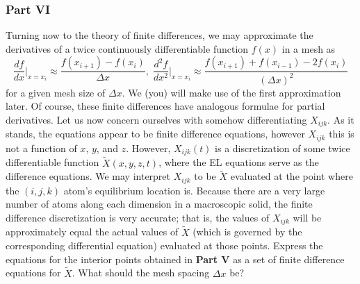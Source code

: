 \documentclass[letterpaper,12pt]{article}
\newcommand*{\deriv}[2]{\frac{d #1}{d #2}}
\newcommand*{\nderiv}[3]{\frac{d^{#3} #1}{d #2^{#3}}}
\begin{document}
\begin{flushleft}
    \subsubsection*{Part VI}
    Turning now to the theory of finite differences, we may approximate the derivatives of a twice continuously differentiable function $f(x)$ in a mesh as
    $$\deriv{f}{x}\bigg|_{x=x_i} \approx \frac{f(x_{i+1}) - f(x_i)}{\Delta x}, \; \nderiv{f}{x}{2}\bigg|_{x=x_i} \approx \frac{f(x_{i+1}) + f(x_{i-1}) - 2f(x_i)}{\left(\Delta x\right)^2}$$
    for a given mesh size of $\Delta x$. We (you) will make use of the first approximation later. Of course, these finite differences have analogous formulae for partial derivatives.\newline\newline
    Let us now concern ourselves with somehow differentiating $X_{ijk}$. As it stands, the equations appear to be finite difference equations, however $X_{ijk}$ this is not a function of $x$, $y$, and $z$. However, $X_{ijk}(t)$ is a discretization of some twice differentiable function $\tilde{X}(x, y, z, t)$, where the EL equations serve as the difference equations. We may interpret $X_{ijk}$ to be $\tilde{X}$ evaluated at the point where the $(i, j, k)$ atom's equilibrium location is. Because there are a very large number of atoms along each dimension in a macroscopic solid, the finite difference discretization is very accurate; that is, the values of $X_{ijk}$ will be approximately equal the actual values of $\tilde{X}$ (which is governed by the corresponding differential equation) evaluated at those points.\newline\newline
    Express the equations for the interior points obtained in \textbf{Part V} as a set of finite difference equations for $\tilde{X}$. What should the mesh spacing $\Delta x$ be?


\end{flushleft}
\end{document}

